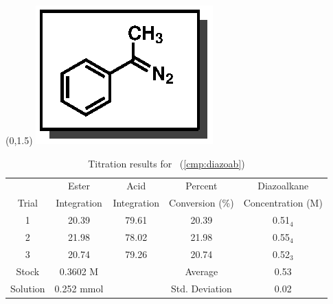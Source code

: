 \begin{singlespace}
\begin{table}[htbp]
\begin{textblock}{1}(0,1.5)
\includegraphics[scale=0.8]{chp_asymmetric/images/diazoab}
\end{textblock}
\flushright
{\small
\begin{tabular}{ccccc} 
\toprule
&Ester&Acid&Percent&Diazoalkane\\
Trial&Integration&Integration&Conversion (\%)&Concentration (M) \\ 
\midrule
1 & 20.39 & 79.61 & 20.39 & 0.51$_4$ \\
2 & 21.98 & 78.02 & 21.98 & 0.55$_4$ \\
3 & 20.74 & 79.26 & 20.74 & 0.52$_3$ \\
\midrule
Stock & 0.3602 M & & Average & 0.53 \\
Solution & 0.252 mmol & & Std. Deviation & 0.02 \\
\bottomrule
\end{tabular}
\caption{Titration results for \CMPdiazoab~(\ref{cmp:diazoab})}
}
\end{table}
\end{singlespace}

